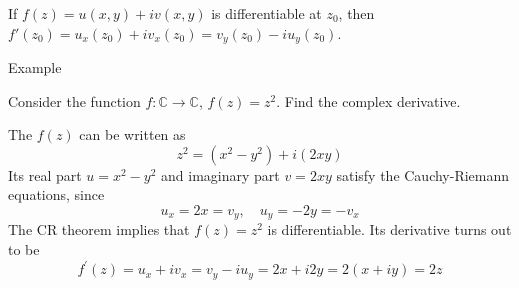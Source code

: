\documentclass[11pt]{beamer}
\theoremstyle{plain}
\begin{document}
\begin{frame}
    \begin{example}
        If $f(z)=u(x,y)+i v(x,y)$ is differentiable at $z_0$, then $f'(z_0)=u_x(z_0)+i v_x(z_0)=v_y(z_0)-i u_y(z_0)$.
    \end{example}
\end{frame}


\begin{frame}{Example}
    \begin{example}
        Consider the function $f:\mathbb C\rightarrow\mathbb C$, $f(z)=z^2$. Find the complex derivative. 
    \end{example}
    The $f(z)$ can be written as
    $$
        z^2=\left(x^2-y^2\right)+i(2 x y)
    $$
Its real part $u=x^2-y^2$ and imaginary part $v=2 x y$ satisfy the Cauchy-Riemann equations, since
    $$
        u_x=2 x=v_y, \quad u_y=-2 y=-v_x
    $$
The CR theorem implies that $f(z)=z^2$ is differentiable. Its derivative turns out to be
    $$
        f^{\prime}(z)=u_x+i v_x=v_y-i u_y=2 x+i 2 y=2(x+i y)=2 z
    $$
\end{frame}
\end{document}
